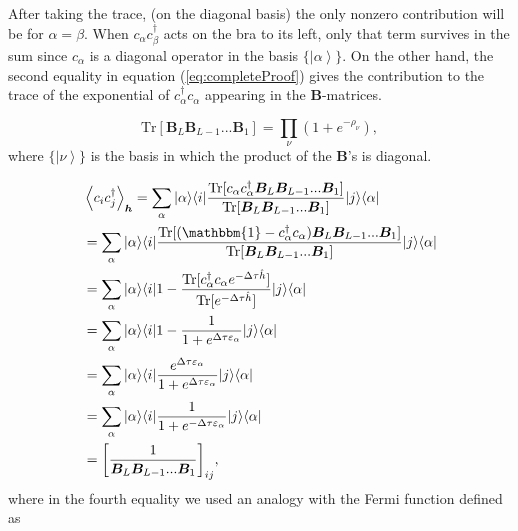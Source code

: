 \documentclass[10pt, twocolumn, twoside]{article}
\begin{document}
After taking the trace, (on the diagonal basis) the only nonzero contribution will be for $\alpha = \beta$. When $c_\alpha c_\beta^\dagger$ acts on the bra to its left, only that term survives in the sum since $c_\alpha$ is a diagonal operator in the basis $\{\left|\alpha\right\rangle\}$. On the other hand, the second equality in equation (\ref{eq:completeProof}) gives the contribution to the trace of the exponential of $c_\alpha^\dagger c_\alpha$ appearing in the $\bm B$-matrices. 

\begin{equation}\label{eq:traceExp}
\text{Tr} [\bm B_L \bm B_{L-1} ... \bm B_1] = \prod_{\nu} ( 1 + e^{-\rho_\nu} ) ,
\end{equation}
where $\{\left|\nu\right\rangle\}$ is the basis in which the product of the $\bm B$'s is diagonal.

\begin{equation}
\begin{split}
&\left\langle c_i c_j^\dagger \right\rangle_{\bm h} =\sum_{\alpha} | \alpha \rangle \langle i | \frac{ \text{Tr}[c_{\alpha} c_\alpha^\dagger \bm B_L \bm B_{L-1} ... \bm B_1] }{\text{Tr} [\bm B_L \bm B_{L-1} ... \bm B_1] } | j \rangle \langle \alpha | \\
&=\sum_{\alpha} | \alpha \rangle \langle i | \frac{ \text{Tr}[( \mathbbm{1} - c_{\alpha}^\dagger c_\alpha) \bm B_L \bm B_{L-1} ... \bm B_1] }{\text{Tr} [\bm B_L \bm B_{L-1} ... \bm B_1] } | j \rangle \langle \alpha | \\
&= \sum_{\alpha} | \alpha \rangle \langle i | 1 -  \frac{ \text{Tr}[c_{\alpha}^\dagger c_\alpha e^{-\Delta \tau \hat{h}}]}{\text{Tr} [e^{-\Delta \tau \hat{h}}] } | j \rangle \langle \alpha | \\
&= \sum_{\alpha} | \alpha \rangle \langle i | 1 -  \frac{1}{1 + e^{\Delta\tau \varepsilon_\alpha}} | j \rangle \langle \alpha | \\
&= \sum_{\alpha} | \alpha \rangle \langle i | \frac{e^{\Delta\tau \varepsilon_\alpha}}{1 + e^{\Delta\tau \varepsilon_\alpha}} | j \rangle \langle \alpha | \\
&= \sum_{\alpha} | \alpha \rangle \langle i | \frac{1}{1 + e^{-\Delta\tau \varepsilon_\alpha}} | j \rangle \langle \alpha | \\
&= \bigg[ \frac{1}{\bm B_L \bm B_{L-1} ... \bm B_{1}} \bigg]_{ij} ,
\end{split}
\end{equation}
where in the fourth equality we used an analogy with the Fermi function defined as 
\end{document}
